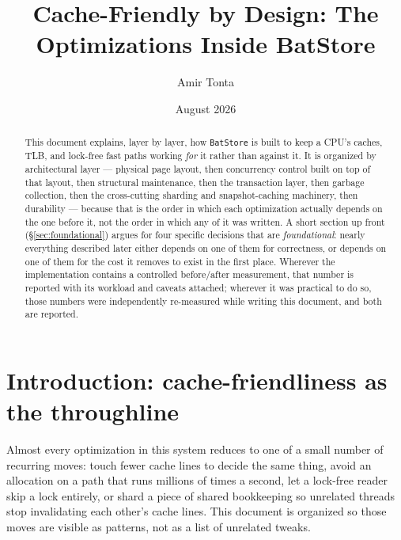 \documentclass[11pt]{article}
\title{Cache-Friendly by Design: The Optimizations Inside BatStore}
\author{Amir Tonta}
\date{August 2026}
\begin{document}
\maketitle

\begin{abstract}
This document explains, layer by layer, how \texttt{BatStore} is built to keep a
CPU's caches, TLB, and lock-free fast paths working \emph{for} it rather than against
it. It is organized by architectural layer --- physical page layout, then
concurrency control built on top of that layout, then structural maintenance, then
the transaction layer, then garbage collection, then the cross-cutting sharding and
snapshot-caching machinery, then durability --- because that is the order in which
each optimization actually depends on the one before it, not the order in which any
of it was written. A short section up front (\S\ref{sec:foundational}) argues for
four specific decisions that are \emph{foundational}: nearly everything described
later either depends on one of them for correctness, or depends on one of them for
the cost it removes to exist in the first place. Wherever the implementation
contains a controlled before/after measurement, that number is reported with its
workload and caveats attached; wherever it was practical to do so, those numbers were
independently re-measured while writing this document, and both are reported.
\end{abstract}

\tableofcontents

\section{Introduction: cache-friendliness as the throughline}
\label{sec:intro}

Almost every optimization in this system reduces to one of a small number of
recurring moves: touch fewer cache lines to decide the same thing, avoid an
allocation on a path that runs millions of times a second, let a lock-free reader
skip a lock entirely, or shard a piece of shared bookkeeping so unrelated threads
stop invalidating each other's cache lines. This document is organized so those moves
are visible as patterns, not as a list of unrelated tweaks.
\end{document}
